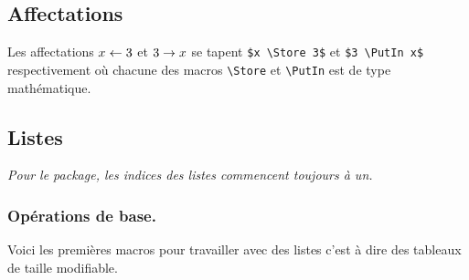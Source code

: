 \documentclass[12pt,a4paper]{article}
\theoremstyle{definition}
\newenvironment{frame-gene}[1][]{
	\begin{tcolorbox}[
		title        = #1, 
		colbacktitle = black!10!white, 
		colback      = white, 
		coltitle     = black,
		fonttitle    = \bfseries\itshape\small, 
		breakable,
		center title]
}{
	\end{tcolorbox}
}
\begin{document}

\subsection{Affectations}

Les affectations $x \leftarrow 3$ et $3 \rightarrow x$ se tapent \verb+$x \Store 3$+ et \verb+$3 \PutIn x$+ respectivement où chacune des macros \verb+\Store+ et \verb+\PutIn+ est de type mathématique.





\subsection{Listes}

\begin{frame-gene}
	\centering\itshape
	Pour le package, les indices des listes commencent toujours à un. 
\end{frame-gene}


\subsubsection{Opérations de base.}

Voici les premières macros pour travailler avec des listes c'est à dire des tableaux de taille modifiable.
\end{document}
